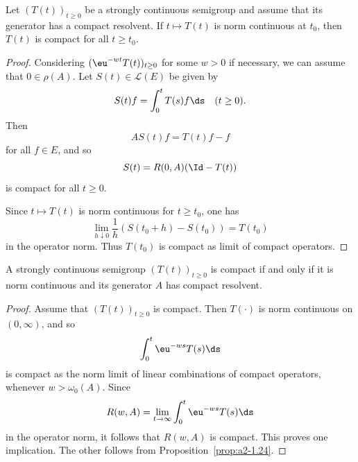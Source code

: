 \begin{proposition}\label{prop:a2-1.24}
Let $(T(t))_{t\geq 0}$ be a strongly continuous semigroup and assume that its generator has a compact resolvent.
If\/ $t \mapsto T(t)$ is norm continuous at $t_0$, then $T(t)$ is compact for all $t \geq t_0$.
\end{proposition}
\begin{proof}
Considering $(\eu^{-wt}T(t))_{t\geq 0}$ for some $w > 0$ if necessary, we can assume that $0 \in \rho(A)$.
Let $S(t) \in \mathcal{L}(E)$ be given by 
%
\[
	S(t)f = \int_0^t T(s)f \ds \quad (t \geq 0) .
\]
%
Then %
\[
	AS(t)f = T(t)f - f
\]
%
for all $f \in E$, and so 
%
\[
	S(t) = R(0,A)(\Id-T(t))
\]
%
is compact for all $t \geq 0$.

Since $t \mapsto T(t)$ is norm continuous for $t \geq t_0$, one has 
%
\[
	\lim_{h \downarrow 0} \frac{1}{h}(S(t_0+h)-S(t_0)) = T(t_0)
\]
%
in the operator norm.
Thus $T(t_0)$ is compact as limit of compact operators.
\end{proof}
\begin{theorem}\label{thm:a2-1.25}
A strongly continuous semigroup $(T(t))_{t\geq 0}$ is compact if and only if it is norm continuous and its generator $A$ has compact resolvent.
\end{theorem}
\begin{proof}
Assume that $(T(t))_{t\geq 0}$ is compact. Then $T(\cdot)$ is norm continuous on $(0,\infty)$, and so 
\[
    \int_{0}^{t} \eu^{-ws} T(s) \ds
\]
is compact as the norm limit of linear combinations of compact operators, whenever $w > \omega_{0}(A)$.
Since 
\[
    R(w,A) = \lim_{t \to \infty} \int_{0}^{t} \eu^{-ws} T(s) \ds
\]
in the operator norm, it follows that $R(w,A)$ is compact.
This proves one implication.
The other follows from Proposition~\ref{prop:a2-1.24}. 
\end{proof}
